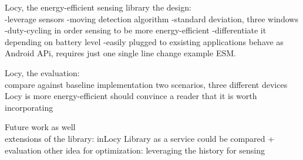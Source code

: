 Locy, the energy-efficient sensing library the design:\\
	-leverage sensors
		-moving detection algorithm
			-standard deviation, three windows
	-duty-cycling in order sensing to be more energy-efficient
		-differentiate it depending on battery level
	-easily plugged to exsisting applications
		behave as Android APi, requires just one single line change
		example ESM.
	
Locy, the evaluation: \\
	compare against baseline implementation
	two scenarios, three different devices
	Locy is more energy-efficient
	should convince a reader that it is worth incorporating

Future work as well\\
	extensions of the library:
		inLocy
		Library as a service could be compared
		+ evaluation
	other idea for optimization:
		leveraging the history for sensing